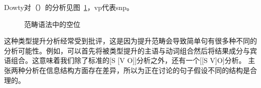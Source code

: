 \begin{exe}
\begin{xlist}[iv.]
\begin{exe}
\begin{xlist}[iv.]
\noindent
Dowty对（）的分析见图~\ref{Abb-CG-Gapping}，vp代表s\bs np。
\begin{figure}
\caption{\label{Abb-CG-Gapping}范畴语法中的空位}
\end{figure}%
这种类型提升分析经常受到批评，这是因为提升范畴会导致简单句有很多种不同的分析可能性。例如，可以首先将被类型提升的主语与动词组合然后将结果成分与宾语组合。这意味着我们除了标准的[S [V O]]分析之外，还有一个[[S V]O]分析。 \citet{Steedman91a}主张两种分析在信息结构方面存在差异，所以为正在讨论的句子假设不同的结构是合理的。


\end{xlist}
\end{exe}
\end{xlist}
\end{exe}
